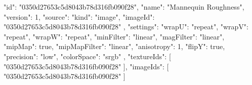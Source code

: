 {
  "id": "0350d27653c5d8043b78d316fb090f28",
  "name": "Mannequin Roughness",
  "version": 1,
  "source": {
    "kind": "image",
    "imageId": "0350d27653c5d8043b78d316fb090f28"
  },
  "settings": {
    "wrapU": "repeat",
    "wrapV": "repeat",
    "wrapW": "repeat",
    "minFilter": "linear",
    "magFilter": "linear",
    "mipMap": true,
    "mipMapFilter": "linear",
    "anisotropy": 1,
    "flipY": true,
    "precision": "low",
    "colorSpace": "srgb"
  },
  "textureIds": [
    "0350d27653c5d8043b78d316fb090f28"
  ],
  "imageIds": [
    "0350d27653c5d8043b78d316fb090f28"
  ]
}
